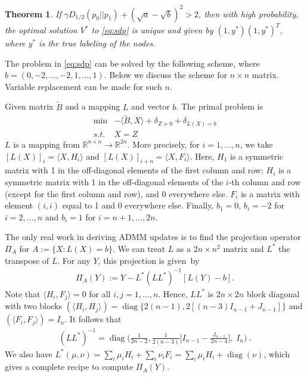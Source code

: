 \documentclass{ctexart}
\newtheorem{theorem}{Theorem}
\DeclareMathOperator{\diag}{diag}
\begin{document}
\begin{theorem}\label{thm:sdp}
	If $\gamma D_{1/2}(p_0||p_1)  + (\sqrt{a} - \sqrt{b})^2 > 2$, then with high probability, the optimal solution
	$V^*$ to \eqref{eq:sdp} is unique and given by $(1,y^*)(1,y^*)^T$, where $y^*$ is the true labeling of the nodes.
\end{theorem}
The problem in \eqref{eq:sdp} can be solved by the following scheme, where $b=(0, -2, \dots, -2, 1, \dots, 1)$. Below we discuss the scheme for $n\times n$ matrix. Variable replacement can be made
for such $n$.

Given matrix $\widetilde{B}$ and a mapping $L$ and vector $b$. The primal
problem is
\begin{align*}
\min & - \langle \widetilde{B}, X\rangle + \delta_{Z \succeq 0} + \delta_{L(X) = b}\\
s.t.& X=Z
\end{align*}
$L$ is a mapping from $\mathbb{R}^{n \times n} \to \mathbb{R}^{2n}$.
More precisely, for $i=1,\dots,n$, we  take
$[L(X)]_i = \langle X,H_i \rangle$ and $[L(X)]_{i+n} = \langle X,F_i \rangle$. Here,
$H_1$ is a symmetric matrix with 1 in the off-diagonal elements of the first column and row;
$H_i$ is a symmetric matrix with 1 in the off-diagonal elements of the
$i$-th column and row (except for the first column and row), and 0 everywhere else.  $F_i$ is a matrix with
element $(i,i)$ equal to 1 and 0 everywhere else. 
Finally, $b_1=0$, $b_i = -2$ for $i=2,\dots,n$ and $b_i = 1$ for $i=n+1, \dots, 2n$. 

The only real work in deriving ADMM updates is to find the projection operator $\Pi_{A}$ for $ A := \{X: L(X) = b\}$.
We can treat $L$ as a $2n \times n^2$ matrix and $L^*$ the transpose of $L$. 
For any $Y$, this projection is given~by 
\begin{align}\label{eq:proj:L:Y}
\Pi_{A}(Y) := Y - L^* (L L^*)^{-1}[ L(Y) - b] .
\end{align}
Note that $\langle H_i,F_j \rangle = 0$
for all $i,j = 1, \dots, n$.
Hence, $L L^*$ is $2n\times 2n$ block diagonal with two blocks $(\langle H_i,H_j \rangle) =\diag\{2(n-1), 2[(n-3)I_{n-1}+J_{n-1}]\} $ and 
$(\langle F_i,F_j \rangle) = I_n$. It follows that
\begin{align*}
(LL^*)^{-1} = \diag\Big(\frac{1}{2n-2},\frac{1}{2(n-3)} 
\big[ I_{n-1} - \frac{J_{n-1}}{2n-4} \big],\; I_n \Big) \ . 
\end{align*}
We also have $L^*(\mu,\nu) = \sum_i \mu_i H_i + \sum_i \nu_i F_i =
\sum_i \mu_i H_i + \diag(\nu)$, which gives a complete
recipe to compute $\Pi_{A}(Y)$.
\end{document}
